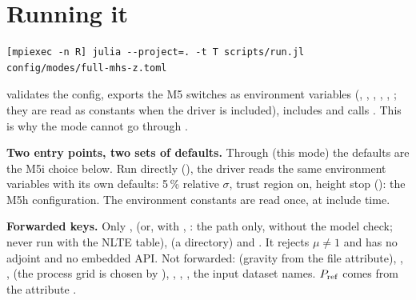 


\section{Running it}
{\footnotesize\begin{verbatim}
[mpiexec -n R] julia --project=. -t T scripts/run.jl config/modes/full-mhs-z.toml
\end{verbatim}}
 validates the config, exports the M5 switches as environment variables (,
, , , , ; they are
read as constants when the driver is included), includes  and calls
. This is why the mode cannot go through .

\textbf{Two entry points, two sets of defaults.} Through  (this mode) the defaults are the M5i choice below.
Run directly (), the driver reads the same
environment variables with its own defaults: 5\,\% relative $\sigma$, trust region on, height stop (): the M5h
configuration. The environment constants are read once, at include time.

\textbf{Forwarded keys.} Only ,  (or, with ,
: the path only, without the model check; never run with the NLTE table),  (a
directory) and . It rejects $\mu\ne1$ and has no adjoint and no embedded API. Not forwarded:  (gravity from the file attribute), , \code{[mhs]},
\code{[parallel]} (the process grid is chosen by ), \code{[tau]}, \code{[output]},
, the input dataset names. $P_{\rm ref}$ comes from the attribute .

